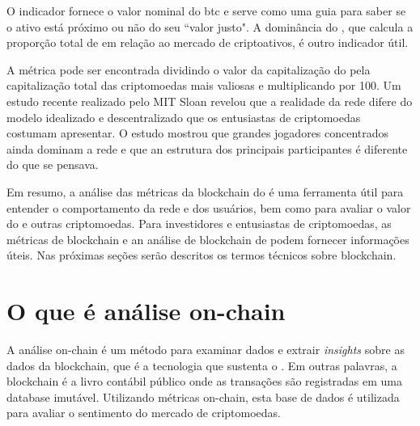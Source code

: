\documentclass[a4paper,12pt]{article}
\newcommand{\printingbibliography}{%

    \pagestyle{myheadings}
    \markright{}
    \sloppy
    \printbibliography[heading=bibintoc, %
                   title=Bibliography %
                  ]
    \fussy%
}
\begin{document}
O indicador fornece o valor nominal do btc e serve como uma guia para saber se o ativo 
está próximo ou não do seu ``valor justo". A dominância do \btc, que calcula a proporção 
total de \btcspace em relação ao mercado de criptoativos, é outro indicador útil.

A métrica pode ser encontrada dividindo o valor da capitalização do \btcspace pela capitalização 
total das criptomoedas mais valiosas e multiplicando por 100.
Um estudo recente realizado pelo MIT Sloan revelou que a realidade da rede \btcspace difere do modelo 
idealizado e descentralizado que os entusiastas de criptomoedas costumam apresentar. O estudo 
mostrou que grandes jogadores concentrados ainda dominam a rede e que an estrutura dos principais 
participantes é diferente do que se pensava.

Em resumo, a análise das métricas da blockchain do \btcspace é uma ferramenta útil para entender 
o comportamento da rede e dos usuários, bem como para avaliar o valor do \btcspace e outras criptomoedas. 
Para investidores e entusiastas de criptomoedas, as métricas de blockchain e an análise de blockchain 
de podem fornecer informações úteis. Nas pr\'oximas se\c{c}\~oes ser\~ao descritos os termos t\'ecnicos
sobre blockchain.

\section{O que \'e an\'alise on-chain}
\hspace{0.5cm}A an\'alise on-chain é um método para examinar dados e extrair \textit{insights} 
sobre as dados da blockchain, que é a tecnologia que sustenta o \btc. Em outras palavras, a blockchain 
é a livro cont\'abil p\'ublico onde as transações são registradas em uma database imut\'avel. 
Utilizando m\'etricas on-chain, esta base de dados é utilizada para avaliar o sentimento do mercado 
de criptomoedas.


\printingbibliography
\end{document}

